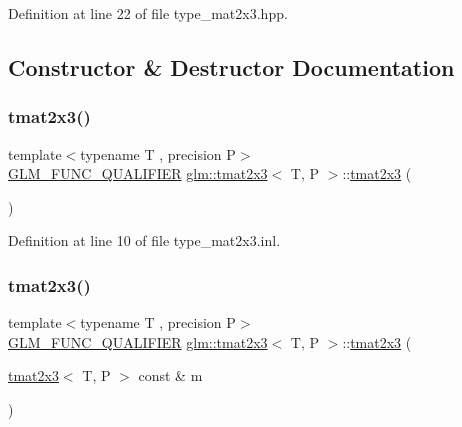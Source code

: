 Definition at line 22 of file type\+\_\+mat2x3.\+hpp.



\subsection{Constructor \& Destructor Documentation}
\mbox{\label{structglm_1_1tmat2x3_afefe2e6e3e0a1e616dcf4f930827f5d1}} 
\subsubsection{\texorpdfstring{tmat2x3()}{tmat2x3()}\hspace{0.1cm}{\footnotesize\ttfamily [1/22]}}
{\footnotesize\ttfamily template$<$typename T , precision P$>$ \\
\mbox{\hyperlink{setup_8hpp_a33fdea6f91c5f834105f7415e2a64407}{G\+L\+M\+\_\+\+F\+U\+N\+C\+\_\+\+Q\+U\+A\+L\+I\+F\+I\+ER}} \mbox{\hyperlink{structglm_1_1tmat2x3}{glm\+::tmat2x3}}$<$ T, P $>$\+::\mbox{\hyperlink{structglm_1_1tmat2x3}{tmat2x3}} (\begin{DoxyParamCaption}{ }\end{DoxyParamCaption})}



Definition at line 10 of file type\+\_\+mat2x3.\+inl.

\mbox{\label{structglm_1_1tmat2x3_a8552e4158f1d2e3fa2aac635585e7f94}} 
\subsubsection{\texorpdfstring{tmat2x3()}{tmat2x3()}\hspace{0.1cm}{\footnotesize\ttfamily [2/22]}}
{\footnotesize\ttfamily template$<$typename T , precision P$>$ \\
\mbox{\hyperlink{setup_8hpp_a33fdea6f91c5f834105f7415e2a64407}{G\+L\+M\+\_\+\+F\+U\+N\+C\+\_\+\+Q\+U\+A\+L\+I\+F\+I\+ER}} \mbox{\hyperlink{structglm_1_1tmat2x3}{glm\+::tmat2x3}}$<$ T, P $>$\+::\mbox{\hyperlink{structglm_1_1tmat2x3}{tmat2x3}} (\begin{DoxyParamCaption}\item[{\mbox{\hyperlink{structglm_1_1tmat2x3}{tmat2x3}}$<$ T, P $>$ const \&}]{m }\end{DoxyParamCaption})}



